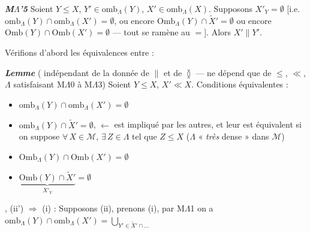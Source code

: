 \documentclass[11pt,a4paper]{article}
\begin{document}
\textbf{\emph{M$\Lambda$'5}} Soient $Y \leq X$,  
$Y' \in \mathrm{omb}_{\Lambda}(Y)$, $X' \in \mathrm{omb}_{\Lambda}(X)$. Supposons $X'_Y = \emptyset$ [i.e.\ $\mathrm{omb}_{\Lambda}(Y) \cap \mathrm{omb}_{\Lambda}(X') = \emptyset$, ou encore  $\mathrm{Omb}_{\Lambda}(Y) \cap \widetilde{X}' = \emptyset$ ou encore $\mathrm{Omb}(Y) \cap \mathrm{Omb}(X') = \emptyset$ — tout se ramène au $=$]. Alors $X' \parallel Y'$.

Vérifions d'abord les équivalences entre \ill{} :

\textbf{\emph{Lemme}} (\struck{\ill{}} indépendant de la donnée de $\parallel$ et de $\between$ — ne dépend que de $\leq$, $\ll$, $\Lambda$ satisfaisant M$\Lambda$0 à M$\Lambda$3) Soient $Y \leq X$, $X' \ll X$.  Conditions équivalentes  :
\begin{itemize}
  \item[(i)] $\mathrm{omb}_{\Lambda}(Y) \cap \mathrm{omb}_{\Lambda}(X') = \emptyset$
  \item[(ii)] $\mathrm{omb}_{\Lambda}(Y) \cap \widetilde{X}' = \emptyset$, $\longleftarrow$ est impliqué par les autres, et leur est équivalent si on suppose $\forall\, X \in \mathcal{M}$, $\exists\, Z \in \Lambda$ tel que $Z \leq X$ ($\Lambda$ « \emph{très} dense » dans $\mathcal{M}$)
  \item[(i')] $\mathrm{Omb}_{\Lambda}(Y) \cap \mathrm{Omb}(X') = \emptyset$
  \item[(ii')] $\underbrace{\mathrm{Omb}(Y) \cap \widetilde{X}'}_{X'_Y} = \emptyset$
\end{itemize}

, (ii') $\Longrightarrow$ (i) :  Supposons (ii), prenons (i), par M$\Lambda$1 on a $\mathrm{omb}_{\Lambda}(Y) \cap \mathrm{omb}_{\Lambda}(X') = \bigcup_{Y' \in \widetilde{X}' \cap \ldots}$
\end{document}
